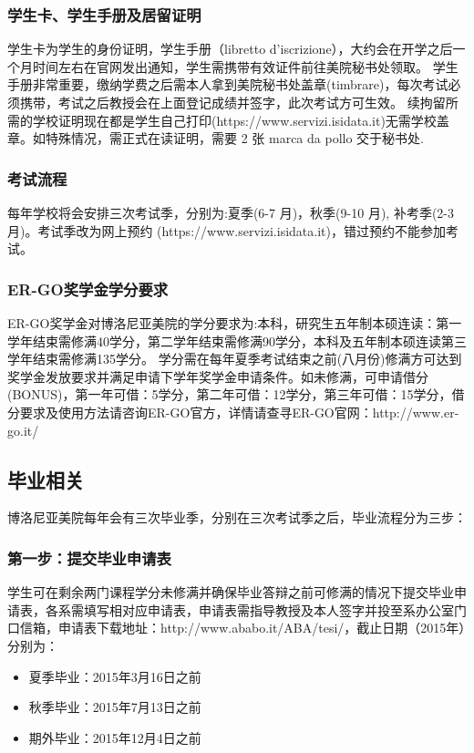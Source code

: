 \documentclass[3pt,a5paper,openright,twoside]{book}
\begin{document}
\subsubsection{学生卡、学生手册及居留证明}
学生卡为学生的身份证明，学生手册（libretto d’iscrizione），大约会在开学之后一个月时间左右在官网发出通知，学生需携带有效证件前往美院秘书处领取。
学生手册非常重要，缴纳学费之后需本人拿到美院秘书处盖章(timbrare)，每次考试必须携带，考试之后教授会在上面登记成绩并签字，此次考试方可生效。
续拘留所需的学校证明现在都是学生自己打印(https://www.servizi.isidata.it)无需学校盖章。如特殊情况，需正式在读证明，需要 2 张 marca da pollo 交于秘书处.

\subsubsection{考试流程}
每年学校将会安排三次考试季，分别为:夏季(6-7 月)，秋季(9-10 月), 补考季(2-3 月)。考试季改为网上预约 (https://www.servizi.isidata.it)，错过预约不能参加考试。


\subsubsection{ER-GO奖学金学分要求}
ER-GO奖学金对博洛尼亚美院的学分要求为:本科，研究生五年制本硕连读：第一学年结束需修满40学分，第二学年结束需修满90学分，本科及五年制本硕连读第三学年结束需修满135学分。
学分需在每年夏季考试结束之前(八月份)修满方可达到奖学金发放要求并满足申请下学年奖学金申请条件。如未修满，可申请借分(BONUS)，第一年可借：5学分，第二年可借：12学分，第三年可借：15学分，借分要求及使用方法请咨询ER-GO官方，详情请查寻ER-GO官网：http://www.er-go.it/


\subsection{毕业相关}
博洛尼亚美院每年会有三次毕业季，分别在三次考试季之后，毕业流程分为三步：

\subsubsection{第一步：提交毕业申请表}
学生可在剩余两门课程学分未修满并确保毕业答辩之前可修满的情况下提交毕业申请表，各系需填写相对应申请表，申请表需指导教授及本人签字并投至系办公室门口信箱，申请表下载地址：http://www.ababo.it/ABA/tesi/，截止日期（2015年）分别为：

\begin{itemize}
  \item 夏季毕业：2015年3月16日之前
  \item 秋季毕业：2015年7月13日之前
  \item 期外毕业：2015年12月4日之前
\end{itemize}
\end{document}
